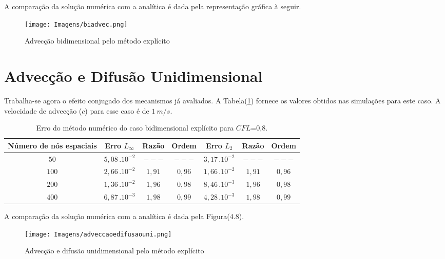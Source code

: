 	A comparação da solução numérica com a analítica é dada pela representação gráfica à seguir.

\newpage

\begin{figure}[ht!]
	\label{badvexplicito}
	\centering
	\texttt{[image: Imagens/biadvec.png]}
	\caption{Advecção bidimensional pelo método explícito}
\end{figure}
	
\section{Advecção e Difusão Unidimensional}
\noindent

	Trabalha-se agora o efeito conjugado dos mecanismos já avaliados. A Tabela(\ref{tabela7}) fornece os valores obtidos nas simulações para este caso. A velocidade de advecção ($c$) para esse caso é de $1 \ m/s$.
	
	\begin{table}[h!]
	\caption{Erro do método numérico do caso bidimensional explícito para $CFL$=0,8.}
	\label{tabela7}
	\centering
	\begin{tabular}{c | c c c | c c c}
		\hline
		Número de nós  espaciais&       Erro $L_\infty$       	& Razão   	 & Ordem   & Erro $L_{2}$ 				& Razão 	  & Ordem  \\ \hline
		$50$ 					&		$5,08 \, . 10^{-2}$     & $---$      & $---$   &       $3,17 \, . 10^{-2}$  & $---$       & $---$    \\ 
		$100$ 					&       $2,66 \, . 10^{-2}$     & $1,91$     & $0,96$  &       $1,66 \, . 10^{-2}$  & $1,91$      & $0,96$    \\ 
		$200$ 					&       $1,36 \, . 10^{-2}$     & $1,96$     & $0,98$  &       $8,46 \, . 10^{-3}$  & $1,96$      & $0,98$    \\ 
		$400$ 					&       $6,87 \, . 10^{-3}$     & $1,98$     & $0,99$  &       $4,28 \, . 10^{-3}$  & $1,98$      & $0,99$    \\ \hline

	\end{tabular}
\end{table}	

A comparação da solução numérica com a analítica é dada pela Figura(4.8).

\newpage

\begin{figure}[ht!]
	\label{difadvec}
	\centering
	\texttt{[image: Imagens/adveccaoedifusaouni.png]}
	\caption{Advecção e difusão unidimensional pelo método explícito}
\end{figure}

